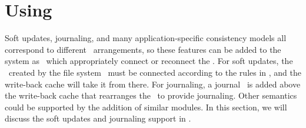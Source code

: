 \section{Using \ChDescs}
\label{sec:using}

Soft updates, journaling, and many application-specific consistency models all
correspond to different \chdesc\ arrangements, so these features can be added to
the system as \modules\ which appropriately connect or reconnect the \chdescs.
For soft updates, the \chdescs\ created by the file system \module\ must be
connected according to the rules in \cite{ganger00soft}, and the write-back
cache will take it from there. For journaling, a journal \module\ is added above
the write-back cache that rearranges the \chdescs\ to provide journaling. Other
semantics could be supported by the addition of similar modules. In this
section, we will discuss the soft updates and journaling support in \Kudos.








